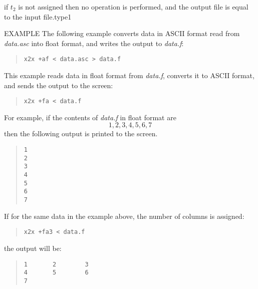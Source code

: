 \begin{options}
{                if $t_2$ is not assigned then no operation is
                performed, and the output file is equal to the input
                file.}{type1}
\end{options}

\begin{qsection}{EXAMPLE}
The following example converts data in ASCII format
read from {\em data.asc} into float format,
and writes the output to {\em data.f}:
\begin{quote}
  \verb!x2x +af < data.asc > data.f!
\end{quote}
\par
This example reads data in float format from {\em data.f},
converts it to ASCII format, and sends the output to the screen:
\begin{quote}
  \verb!x2x +fa < data.f!
\end{quote}
For example, if the contents of {\em data.f} in float format are
\begin{displaymath}
  1, 2, 3, 4, 5, 6, 7
\end{displaymath}
then the following output is printed to the screen.
\begin{quote}
  \verb!1! \\
  \verb!2! \\
  \verb!3! \\
  \verb!4! \\
  \verb!5! \\
  \verb!6! \\
  \verb!7!
\end{quote}
\par
If for the same data in the example above,
the number of columns is assigned:
\begin{quote}
  \verb!x2x +fa3 < data.f!
\end{quote}
the output will be:
\begin{quote}
  \verb!1       2        3! \\
  \verb!4       5        6! \\
  \verb!7!
\end{quote}

\end{qsection}
